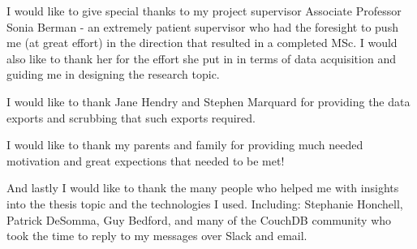 I would like to give special thanks to my project supervisor Associate Professor Sonia Berman - an extremely patient supervisor who had the foresight to push me (at great effort) in the direction that resulted in a completed MSc. I would also like to thank her for the effort she put in in terms of data acquisition and guiding me in designing the research topic.

I would like to thank Jane Hendry and Stephen Marquard for providing the data exports and scrubbing that such exports required.

I would like to thank my parents and family for providing much needed motivation and great expections that needed to be met!

And lastly I would like to thank the many people who helped me with insights into the thesis topic and the technologies I used. Including: Stephanie Honchell, Patrick DeSomma, Guy Bedford, and many of the CouchDB community who took the time to reply to my messages over Slack and email.